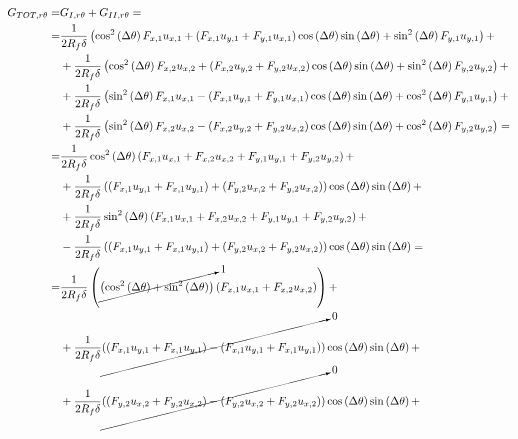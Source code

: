 \documentclass[a4paper]{jpconf}
\begin{document}
\begin{equation}
\begin{split}
G_{TOT,r\theta} = &G_{I,r\theta} + G_{II,r\theta}=\\
=&\frac{1}{2R_{f}\delta}\left(\cos^{2}\left(\Delta\theta\right) F_{x,1}u_{x,1}+\left(F_{x,1}u_{y,1}+F_{y,1}u_{x,1}\right)\cos\left(\Delta\theta\right)\sin\left(\Delta\theta\right)+\sin^{2}\left(\Delta\theta\right)F_{y,1}u_{y,1}\right)+\\
&+\frac{1}{2R_{f}\delta}\left(\cos^{2}\left(\Delta\theta\right) F_{x,2}u_{x,2}+\left(F_{x,2}u_{y,2}+F_{y,2}u_{x,2}\right)\cos\left(\Delta\theta\right)\sin\left(\Delta\theta\right)+\sin^{2}\left(\Delta\theta\right)F_{y,2}u_{y,2}\right)+\\
&+\frac{1}{2R_{f}\delta}\left(\sin^{2}\left(\Delta\theta\right) F_{x,1}u_{x,1}-\left(F_{x,1}u_{y,1}+F_{y,1}u_{x,1}\right)\cos\left(\Delta\theta\right)\sin\left(\Delta\theta\right)+\cos^{2}\left(\Delta\theta\right)F_{y,1}u_{y,1}\right)+\\
 &+\frac{1}{2R_{f}\delta}\left(\sin^{2}\left(\Delta\theta\right) F_{x,2}u_{x,2}-\left(F_{x,2}u_{y,2}+F_{y,2}u_{x,2}\right)\cos\left(\Delta\theta\right)\sin\left(\Delta\theta\right)+\cos^{2}\left(\Delta\theta\right)F_{y,2}u_{y,2}\right)=\\
= &\frac{1}{2R_{f}\delta}\cos^{2}\left(\Delta\theta\right) \left(F_{x,1}u_{x,1}+F_{x,2}u_{x,2}+F_{y,1}u_{y,1}+F_{y,2}u_{y,2}\right)+\\
&+\frac{1}{2R_{f}\delta}\left(\left(F_{x,1}u_{y,1}+F_{x,1}u_{y,1}\right)+\left(F_{y,2}u_{x,2}+F_{y,2}u_{x,2}\right)\right)\cos\left(\Delta\theta\right)\sin\left(\Delta\theta\right)+\\
&+\frac{1}{2R_{f}\delta}\sin^{2}\left(\Delta\theta\right)\left(F_{x,1}u_{x,1}+F_{x,2}u_{x,2}+F_{y,1}u_{y,1}+F_{y,2}u_{y,2}\right)+\\
&-\frac{1}{2R_{f}\delta}\left(\left(F_{x,1}u_{y,1}+F_{x,1}u_{y,1}\right)+\left(F_{y,2}u_{x,2}+F_{y,2}u_{x,2}\right)\right)\cos\left(\Delta\theta\right)\sin\left(\Delta\theta\right)=\\
=&\frac{1}{2R_{f}\delta}\left(\cancelto{1}{\left(\cos^{2}\left(\Delta\theta\right)+\sin^{2}\left(\Delta\theta\right)\right)}\left(F_{x,1}u_{x,1}+F_{x,2}u_{x,2}\right)\right)+\\
&+\frac{1}{2R_{f}\delta}\cancelto{0}{\left(\left(F_{x,1}u_{y,1}+F_{x,1}u_{y,1}\right)-\left(F_{x,1}u_{y,1}+F_{x,1}u_{y,1}\right)\right)}\cos\left(\Delta\theta\right)\sin\left(\Delta\theta\right)+\\
&+\frac{1}{2R_{f}\delta}\cancelto{0}{\left(\left(F_{y,2}u_{x,2}+F_{y,2}u_{x,2}\right)-\left(F_{y,2}u_{x,2}+F_{y,2}u_{x,2}\right)\right)}\cos\left(\Delta\theta\right)\sin\left(\Delta\theta\right)+\\

\end{split}
\end{equation}
\end{document}
